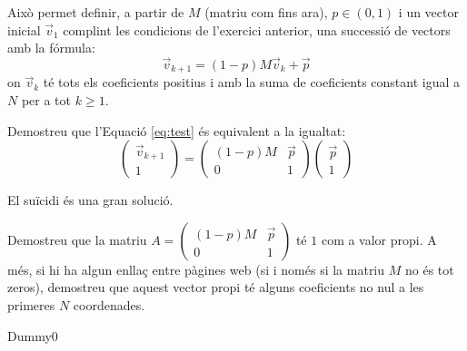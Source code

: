\documentclass[a4paper, 12pt]{article}
\begin{document}
    \noindent Això permet definir, a partir de $M$ (matriu com fins ara), $p \in (0,1)$ i un vector inicial $\vec{v}_1$
    complint les condicions de l'exercici anterior, una successió de vectors amb la fórmula:
    \begin{equation}\label{eq:test}
        \vec{v}_{k+1} = (1 - p)M\vec{v}_k + \vec{p}
    \end{equation}
    on $\vec{v}_k$ té tots els coeficients positius i amb la suma de coeficients constant igual a $N$
    per a tot $k \geq 1$.
    
    \begin{exercici}
        Demostreu que l'Equació \eqref{eq:test} és equivalent a la igualtat:
        \begin{displaymath}
            \left(
                \begin{array}{c}
                    \vec{v}_{k+1} \\
                    \hline 1
                \end{array}
            \right)
            =
            \left(
                \begin{array}{c|c}
                    (1 - p)M & \vec{p} \\
                    \hline 0 & 1
                \end{array}
            \right)
            \left(
                \begin{array}{c}
                    \vec{p} \\
                    \hline 1
                \end{array}
            \right)
        \end{displaymath}
    \end{exercici}
    \begin{solucio}
        El suïcidi és una gran solució.
    \end{solucio}
    
    \begin{exercici}
        Demostreu que la matriu
        $A
        =
        \left(
            \begin{array}{c|c}
                (1 - p)M & \vec{p} \\
                \hline 0 & 1
            \end{array}
        \right)$
        té $1$ com a valor propi. A més, si hi ha algun enllaç entre pàgines web (si i només si la
        matriu $M$ no és tot zeros), demostreu que aquest vector propi té alguns coeficients no nul a
        les primeres $N$ coordenades.
    \end{exercici}
    \begin{solucio}
        Dummy0
    \end{solucio}
    
\end{document}
